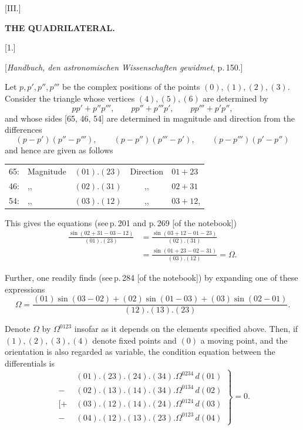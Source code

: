 
\begin{center}
[III.]

\textbf{THE QUADRILATERAL.}

[1.]

[\emph{Handbuch, den astronomischen Wissenschaften gewidmet}, p.\,150.]
\end{center}

Let $p, p', p'', p'''$ be the complex positions of the points $(0), (1), (2), (3)$. Consider the triangle whose vertices $(4), (5), (6)$ are determined by
\[
pp'+p''p''', \qquad pp''+p'''p', \qquad pp'''+p'p'',
\]
and whose sides [65, 46, 54] are determined in magnitude and direction from the differences
\[
(p-p')(p''-p'''), \qquad (p-p'')(p'''-p'), \qquad (p-p''')(p'-p'')
\]
and hence are given as follows

\begin{center}
\begin{tabular}{rllcl}
65: & Magnitude & $(01).(23)$ & Direction & $01+23$\\
46: & ,, & $(02).(31)$ & ,, & $02+31$\\
54: & ,, & $(03).(12)$ & ,, & $03+12$,
\end{tabular}
\end{center}

This gives the equations (see\,p.\,201 and p.\,269 [of the notebook])
\[
\begin{aligned}
\frac{\sin(02+31-03-12)}{(01).(23)} &= \frac{\sin(03+12-01-23)}{(02).(31)}\\
&= \frac{\sin(01+23-02-31)}{(03).(12)} = \Omega.
\end{aligned}
\]

Further, one readily finds (see\,p.\,284 [of the notebook]) by expanding one of these expressions
\[
\Omega = \frac{(01)\sin(03-02)+(02)\sin(01-03)+(03)\sin(02-01)}{(12).(13).(23)}.
\]

Denote $\Omega$ by $\Omega^{0123}$ insofar as it depends on the elements specified above. Then, if $(1), (2), (3), (4)$ denote fixed points and $(0)$ a moving point, and the orientation is also regarded as variable, the condition equation between the differentials is
\[
\left.
\begin{aligned}
&(01).(23).(24).(34).\Omega^{0234}\,d(01)\\
-\;&(02).(13).(14).(34).\Omega^{0134}\,d(02)\\
[+\;&(03).(12).(14).(24).\Omega^{0124}\,d(03)\\
-\;&(04).(12).(13).(23).\Omega^{0123}\,d(04)
\end{aligned}
\right\} = 0.
\]
